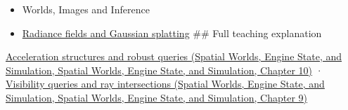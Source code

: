 \begin{itemize}
\item
  {Worlds, Images and Inference}
\item
  \hyperref[appendix-c5b332e400e7]{Radiance fields and Gaussian splatting} \#\# Full teaching explanation
\end{itemize}

\href{../05-Spatial-Worlds-Engine-State-and-Simulation/main.pdf\#nameddest=04-visual-computing-ii-ch029-acceleration-structures-and-robust-queries-1}{Acceleration structures and robust queries (Spatial Worlds, Engine State, and Simulation, Spatial Worlds, Engine State, and Simulation, Chapter 10)} · \href{../05-Spatial-Worlds-Engine-State-and-Simulation/main.pdf\#nameddest=04-visual-computing-ii-ch028-visibility-queries-and-ray-intersections-1}{Visibility queries and ray intersections (Spatial Worlds, Engine State, and Simulation, Spatial Worlds, Engine State, and Simulation, Chapter 9)}
